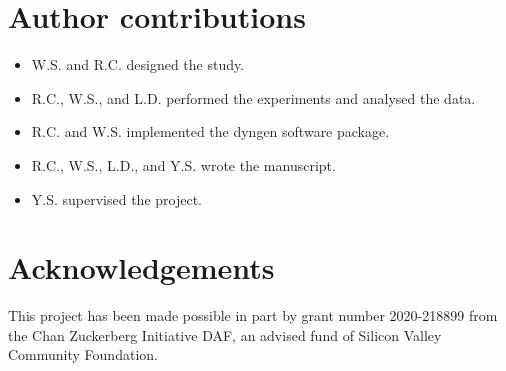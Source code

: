 \documentclass[
  table,
  10pt,
  a4paper]{article}
\providecommand{\tightlist}{%
  \setlength{\itemsep}{0pt}\setlength{\parskip}{0pt}}
\begin{document}
\hypertarget{author-contributions}{%
\section{Author contributions}\label{author-contributions}}

\begin{itemize}
\tightlist
\item
  W.S. and R.C. designed the study.
\item
  R.C., W.S., and L.D. performed the experiments and analysed the data.
\item
  R.C. and W.S. implemented the dyngen software package.
\item
  R.C., W.S., L.D., and Y.S. wrote the manuscript.
\item
  Y.S. supervised the project.
\end{itemize}

\hypertarget{acknowledgements}{%
\section{Acknowledgements}\label{acknowledgements}}

This project has been made possible in part by grant number 2020-218899
from the Chan Zuckerberg Initiative DAF, an advised fund of Silicon
Valley Community Foundation.

\printbibliography
\end{document}
